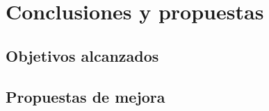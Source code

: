 
\chapter{Conclusiones y propuestas}
\section{Objetivos alcanzados}
\section{Propuestas de mejora}



